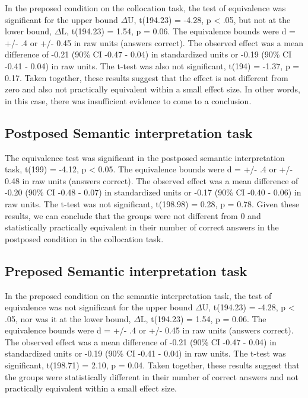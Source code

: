 \documentclass[
  man,floatsintext]{apa6}
\begin{document}
In the preposed condition on the collocation task, the test of equivalence was significant for the upper bound \(\Delta\)U, t(194.23) = -4.28, p \textless{} .05, but not at the lower bound, \(\Delta\)L, t(194.23) = 1.54, p = 0.06.
The equivalence bounds were d = +/- .4 or +/- 0.45 in raw units (answers correct).
The observed effect was a mean difference of -0.21 (90\% CI -0.47 - 0.04) in standardized units or -0.19 (90\% CI -0.41 - 0.04) in raw units.
The t-test was also not significant, t(194) = -1.37, p = 0.17.
Taken together, these results suggest that the effect is not different from zero and also not practically equivalent within a small effect size.
In other words, in this case, there was insufficient evidence to come to a conclusion.

\hypertarget{postposed-semantic-interpretation-task}{%
\subsection{Postposed Semantic interpretation task}\label{postposed-semantic-interpretation-task}}

The equivalence test was significant in the postposed semantic interpretation task, t(199) = -4.12, p \textless{} 0.05.
The equivalence bounds were d = +/- .4 or +/- 0.48 in raw units (answers correct).
The observed effect was a mean difference of -0.20 (90\% CI -0.48 - 0.07) in standardized units or -0.17 (90\% CI -0.40 - 0.06) in raw units.
The t-test was not significant, t(198.98) = 0.28, p = 0.78.
Given these results, we can conclude that the groups were not different from 0 and statistically practically equivalent in their number of correct answers in the postposed condition in the collocation task.

\hypertarget{preposed-semantic-interpretation-task}{%
\subsection{Preposed Semantic interpretation task}\label{preposed-semantic-interpretation-task}}

In the preposed condition on the semantic interpretation task, the test of equivalence was not significant for the upper bound \(\Delta\)U, t(194.23) = -4.28, p \textless{} .05, nor was it at the lower bound, \(\Delta\)L, t(194.23) = 1.54, p = 0.06.
The equivalence bounds were d = +/- .4 or +/- 0.45 in raw units (answers correct).
The observed effect was a mean difference of -0.21 (90\% CI -0.47 - 0.04) in standardized units or -0.19 (90\% CI -0.41 - 0.04) in raw units.
The t-test was significant, t(198.71) = 2.10, p = 0.04.
Taken together, these results suggest that the groups were statistically different in their number of correct answers and not practically equivalent within a small effect size.
\end{document}
